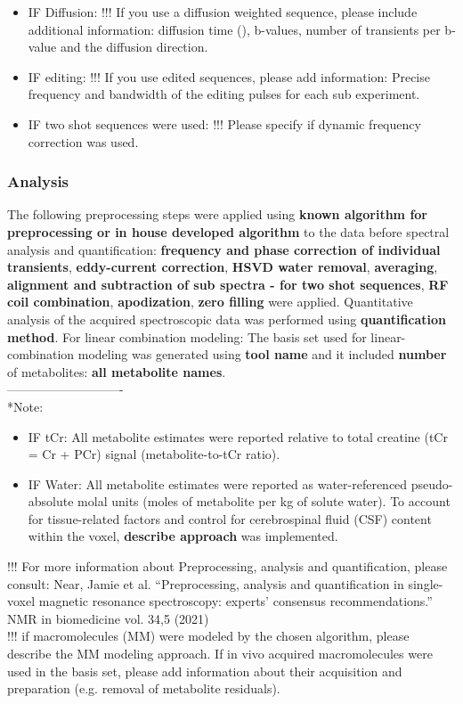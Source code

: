 \documentclass{article}
\begin{document}
\begin{itemize}
    \item IF Diffusion:
    !!! If you use a diffusion weighted sequence, please include additional information: diffusion time (\bigdelta), b-values, number of transients per b-value and the diffusion direction.
    \item IF editing:
    !!! If you use edited sequences, please add information: Precise frequency and bandwidth of the editing pulses for each sub experiment.
    \item IF two shot sequences were used:
    !!! Please specify if dynamic frequency correction was used. 
\end{itemize}

\subsubsection{Analysis}
The following preprocessing steps were applied using \textbf{known algorithm for preprocessing or in house developed algorithm} to the data before spectral analysis and quantification: \textbf{frequency and phase correction of individual transients}, \textbf{eddy-current correction}, \textbf{HSVD water removal}, \textbf{averaging}, \textbf{alignment and subtraction of sub spectra - for two shot sequences}, \textbf{RF coil combination}, \textbf{apodization}, \textbf{zero filling} were applied.
Quantitative analysis of the acquired spectroscopic data was performed using \textbf{quantification method}.
For linear combination modeling: The basis set used for linear-combination modeling was generated using \textbf{tool name} and it included \textbf{number} of metabolites: \textbf{all metabolite names}. \\
----------------------------\\
*Note:
\begin{itemize}
    \item IF tCr: All metabolite estimates were reported relative to total creatine (tCr = Cr + PCr) signal (metabolite-to-tCr ratio).
    \item IF Water: All metabolite estimates were reported as water-referenced pseudo-absolute molal units (moles of metabolite per kg of solute water). To account for tissue-related factors and control for cerebrospinal fluid (CSF) content within the voxel, \textbf{describe approach} was implemented.
\end{itemize}

!!! For more information about Preprocessing, analysis and quantification, please consult: Near, Jamie et al. “Preprocessing, analysis and quantification in single-voxel magnetic resonance spectroscopy: experts' consensus recommendations.” NMR in biomedicine vol. 34,5 (2021) \\ 
!!! if macromolecules (MM) were modeled by the chosen algorithm, please describe the MM modeling approach. If in vivo acquired macromolecules were used in the basis set, please add information about their acquisition and preparation (e.g. removal of metabolite residuals).
\end{document}
